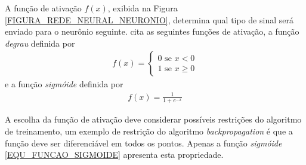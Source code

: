 A função de ativação \(f(x)\), exibida na Figura \ref{FIGURA_REDE_NEURAL_NEURONIO}, determina qual tipo de sinal será enviado para o neurônio seguinte.  cita as seguintes funções de ativação, a função \emph{degrau} definida por
\begin{align}
f(x) = \begin{cases}
		0 \mbox{ se } x < 0 	 \\
		1 \mbox{ se } x \geq 0	 \label{EQU_FUNCAO_DEGRAU}				
	   \end{cases}
\end{align}
e a função \emph{sigmóide} definida por
\begin{align}
f(x) = \frac{1}{1 + e^{-x}} 	\label{EQU_FUNCAO_SIGMOIDE}
\end{align}

A escolha da função de ativação deve considerar possíveis restrições do algoritmo de treinamento, um exemplo de restrição do algoritmo \emph{backpropagation} é que a função deve ser diferenciável em todos os pontos. Apenas a função \emph{sigmóide} \eqref{EQU_FUNCAO_SIGMOIDE} apresenta esta propriedade.

